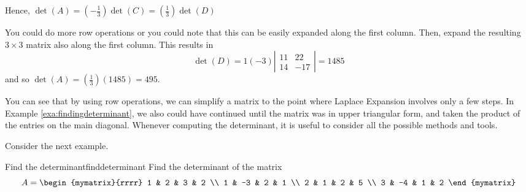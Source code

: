 \begin{solution}
Hence, $\det \left(A\right) = \left(-\frac{1}{3}\right) \det \left( C\right) = \left(\frac{1}{3}\right) \det \left( D\right)$ 

You could do more row operations or you could note that this can be easily
expanded along the first column. Then, expand the resulting $3 \times 3$ matrix
also along the first column. This results in 
\begin{equation*}
\det \left( D\right) =1\left( -3\right) \left\vert
\begin{array}{cc}
11 & 22 \\
14 & -17
\end{array}
\right\vert = 1485
\end{equation*}
and so  $\det \left( A\right) =\left(\frac{1}{3}\right) \left( 1485\right)
=495.$
\end{solution} 

You can see that by using row operations, we can simplify a matrix
to the point where Laplace Expansion involves only a few steps. In Example
\ref{exa:findingdeterminant}, we also could have continued until the matrix was in 
upper triangular form, and taken the product of the entries on the main diagonal. Whenever 
computing the determinant, it is useful to consider all the possible methods and tools.

Consider the next example.

\begin{example}{Find the determinant}{finddeterminant}
Find the determinant of the matrix
\begin{equation*}
A = \begin{mymatrix}{rrrr}
1 & 2 & 3 & 2 \\
1 & -3 & 2 & 1 \\
2 & 1 & 2 & 5 \\
3 & -4 & 1 & 2
\end{mymatrix}
\end{equation*}
\end{example}

